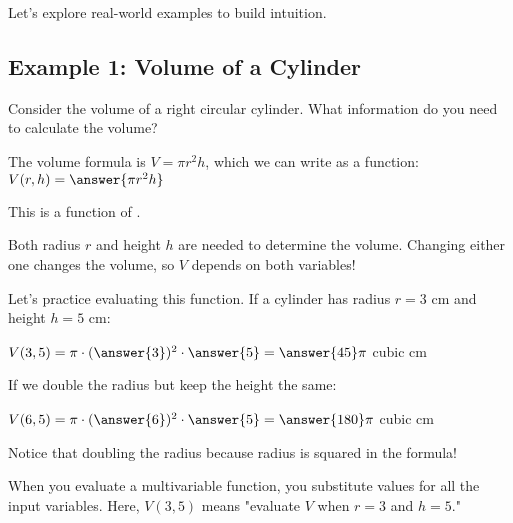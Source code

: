 \documentclass{ximera}
\begin{document}
Let's explore real-world examples to build intuition.

\subsection*{Example 1: Volume of a Cylinder}

\begin{problem}
Consider the volume of a right circular cylinder. What information do you need to calculate the volume?

\begin{selectAll}
\end{selectAll}

The volume formula is $V = \pi r^2 h$, which we can write as a function: $V(r, h) = \answer{\pi r^2 h}$

This is a function of .

\begin{feedback}
Both radius $r$ and height $h$ are needed to determine the volume. Changing either one changes the volume, so $V$ depends on both variables!
\end{feedback}
\end{problem}

\begin{problem}
Let's practice evaluating this function. If a cylinder has radius $r = 3$ cm and height $h = 5$ cm:

$V(3, 5) = \pi \cdot (\answer{3})^2 \cdot \answer{5} = \answer{45}\pi$ cubic cm

If we double the radius but keep the height the same:

$V(6, 5) = \pi \cdot (\answer{6})^2 \cdot \answer{5} = \answer{180}\pi$ cubic cm

Notice that doubling the radius  because radius is squared in the formula!

\begin{feedback}
When you evaluate a multivariable function, you substitute values for all the input variables. Here, $V(3,5)$ means "evaluate $V$ when $r=3$ and $h=5$."
\end{feedback}
\end{problem}
\end{document}
